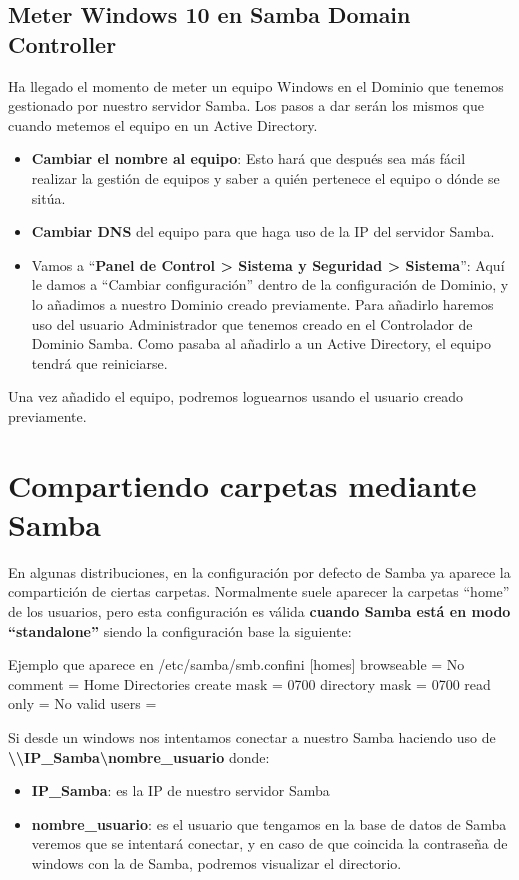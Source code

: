 \documentclass{../../../yukibook.cls/yukibook}
\begin{document}
\subsection{Meter Windows 10 en Samba Domain Controller}
Ha llegado el momento de meter un equipo Windows en el Dominio que tenemos gestionado por nuestro servidor Samba. Los pasos a dar serán los mismos que cuando metemos el equipo en un Active Directory.
\begin{itemize}
    \item \textbf{Cambiar el nombre al equipo}: Esto hará que después sea más fácil realizar la gestión de equipos y saber a quién pertenece el equipo o dónde se sitúa.
    \item \textbf{Cambiar DNS} del equipo para que haga uso de la IP del servidor Samba.
    \item Vamos a “\textbf{Panel de Control > Sistema y Seguridad > Sistema}”: Aquí le damos a “Cambiar configuración” dentro de la configuración de Dominio, y lo añadimos a nuestro Dominio creado previamente. Para añadirlo haremos uso del usuario Administrador que tenemos creado en el Controlador de Dominio Samba. Como pasaba al añadirlo a un Active Directory, el equipo tendrá que reiniciarse.
\end{itemize}
Una vez añadido el equipo, podremos loguearnos usando el usuario creado previamente.

\section{Compartiendo carpetas mediante Samba}
En algunas distribuciones, en la configuración por defecto de Samba ya aparece la compartición de ciertas carpetas. Normalmente suele aparecer la carpetas “home” de los usuarios, pero esta configuración es válida \textbf{cuando Samba está en modo “standalone”} siendo la configuración base la siguiente:


\begin{mycode}{Ejemplo que aparece en \faFile /etc/samba/smb.conf}{ini}{}
[homes]
    browseable = No
    comment = Home Directories
    create mask = 0700
    directory mask = 0700
    read only = No
    valid users = %
\end{mycode}

Si desde un windows nos intentamos conectar a nuestro Samba haciendo uso de \textbf{\textbackslash \textbackslash IP\_Samba\textbackslash nombre\_usuario}  donde:

\begin{itemize}
    \item \textbf{IP\_Samba}: es la IP de nuestro servidor Samba
    \item \textbf{nombre\_usuario}: es el usuario que tengamos en la base de datos de Samba veremos que se intentará conectar, y en caso de que coincida la contraseña de windows con la de Samba, podremos visualizar el directorio.
\end{itemize}
\end{document}
